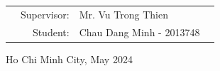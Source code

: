 \documentclass[a4paper]{report}
\begin{document}
\begin{titlepage}
  \begin{table}[h]
    \begin{tabular}{rrll}
      \hspace{5 cm}
       & Supervisor: & Mr. Vu Trong Thien       \\
       & Student:    & Chau Dang Minh - 2013748 \\
    \end{tabular}
  \end{table}
  \vspace{2cm}
  \begin{center}
    {\footnotesize Ho Chi Minh City, May 2024}
  \end{center}
\end{titlepage}



\end{document}
